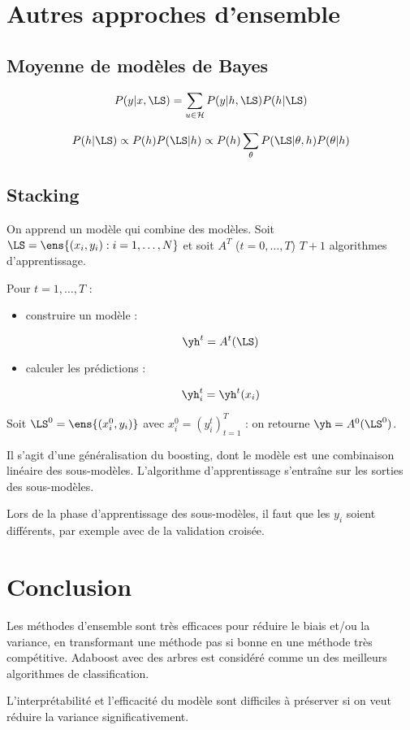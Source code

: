 	
\section{Autres approches d'ensemble}

	\subsection{Moyenne de modèles de Bayes}
	$$P(y \vert x, \LS) = \sum_{u \in \mathcal{H}} P(y \vert h, \LS) P(h \vert \LS)$$
	
	$$P(h \vert \LS) \propto P(h) P(\LS \vert h) \propto P(h) \sum_\theta P(\LS \vert \theta, h) P(\theta \vert h)$$
	
	\subsection{Stacking}
	
	On apprend un modèle qui combine des modèles. Soit $\LS = \ens{(x_i, y_i) : i = 1, \dots , N}$ et soit $A^T$ ($t = 0, \dots , T$) $T + 1$ algorithmes d'apprentissage.
	
	Pour $t = 1, \dots , T$ :
	
	\begin{itemize}
		\item construire un modèle :
		
		$$\yh^t = A^t(\LS)$$
		
		\item calculer les prédictions :
		
		$$\yh_i^t = \yh^t (x_i)$$
	\end{itemize}
	
	Soit $\LS^0 = \ens{(x_i^0, y_i)}$ avec $x_i^0 = (y_i^t)^T_{t = 1}$ : on retourne $\yh = A^0(\LS^0)$.
	
	Il s'agit d'une généralisation du boosting, dont le modèle est une combinaison linéaire des sous-modèles. L'algorithme d'apprentissage s'entraîne sur les sorties des sous-modèles.
	
	
	Lors de la phase d'apprentissage des sous-modèles, il faut que les $y_i$ soient différents, par exemple avec de la validation croisée.
	
	
\section{Conclusion}

Les méthodes d'ensemble sont très efficaces pour réduire le biais et/ou la variance, en transformant une méthode pas si bonne en une méthode très compétitive. Adaboost avec des arbres est considéré comme un des meilleurs algorithmes de classification.

L'interprétabilité et l'efficacité du modèle sont difficiles à préserver si on veut réduire la variance significativement.
